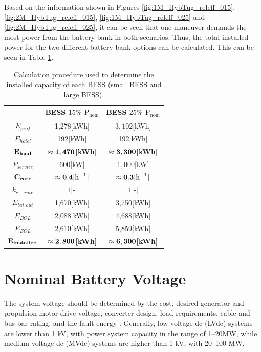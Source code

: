 Based on the information shown in Figures \ref{fig:1M_HybTug_releff_015}, \ref{fig:2M_HybTug_releff_015}, \ref{fig:1M_HybTug_releff_025} and \ref{fig:2M_HybTug_releff_025}, it can be seen that one maneuver demands the most power from the battery bank in both scenarios. Thus, the total installed power for the two different battery bank options can be calculated. This can be seen in Table \ref{tab:Energy_banks}.

\begin{table}[H]
	\centering
	\caption{Calculation procedure used to determine the installed capacity of each BESS (small BESS and large BESS).}
	\label{tab:Energy_banks}
	\begin{tabular}{|c|c|c|}
		\hline      
		& BESS $15\%$ ${\text{P}}_{\text{nom}}$ & BESS $25\%$ ${\text{P}}_{\text{nom}}$ \\		
\hline \hline
${E}_{prof}$ & 1,278[kWh] & $3,102$[kWh] \\
\hline
${E}_{hotel}$ & 192[kWh] & 192[kWh] \\
\hline
$\bf {E}_{load}$ & $\bf \approx 1,470$\textbf{[kWh]}& $\bf \approx 3,300$\textbf{[kWh]} \\
\hline
${P}_{service}$ & $600$[kW] & $1,000$[kW] \\
\hline
$\bf {C}_{rate}$ & $\bf \approx 0.4[\text{h}^{-1}]$ & $\bf \approx 0.3[\text{h}^{-1}]$ \\
\hline
${k}_{c-rate}$ & $1$[-] & $1$[-]  \\ 
\hline
${E}_{bat{\_}out}$ & 1,670[kWh] & 3,750[kWh] \\
\hline
${E}_{BOL}$ & 2,088[kWh] & 4,688[kWh]\\
\hline
${E}_{EOL}$ & 2,610[kWh] & 5,859[kWh] \\
\hline
$\bf {E}_{installed}$ & $\bf \approx 2,800$\textbf{[kWh]}& $\bf \approx 6,300$\textbf{[kWh]} \\
\hline \hline
	\end{tabular}
\end{table}
\section{Nominal Battery Voltage}

The system voltage should be determined by the cost, desired generator and propulsion motor drive voltage, converter design, load requirements, cable and bus-bar rating, and the fault energy \cite{Xu2022}. Generally, low-voltage dc (LVdc) systems are lower than 1 kV, with power system capacity in the range of 1–20MW, while medium-voltage dc (MVdc) systems are higher than 1 kV, with 20–100 MW.


